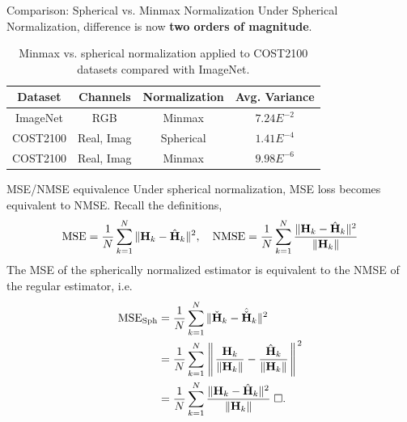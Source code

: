 \documentclass{beamer}
\begin{document}
  \begin{frame}{Comparison: Spherical vs. Minmax Normalization}
    Under Spherical Normalization, difference is now \textbf{two orders of magnitude}.
    \begin{table}[htb]
      \begin{center}
        \begin{tabular}{|c|c|c|c|}
        \hline
        \textbf{Dataset} & \textbf{Channels} & \textbf{Normalization} & \textbf{Avg. Variance} \\ \hline
        ImageNet       & RGB                 & Minmax                 & \underline{$7.24E^{-2}$}       \\ \hline
        COST2100       & Real, Imag          & Spherical              & \underline{$1.41E^{-4}$}       \\ \hline
        COST2100       & Real, Imag          & Minmax                 & $9.98E^{-6}$       \\ \hline
        \end{tabular}
        \caption{Minmax vs. spherical normalization applied to COST2100 datasets compared with ImageNet.}
        \label{tab:minmax-sph-compare} 
      \end{center}
    \end{table}
  \end{frame}
{}
  \begin{frame}{MSE/NMSE equivalence}
    \footnotesize{
    Under spherical normalization, MSE loss becomes equivalent to NMSE. Recall the definitions,
    \begin{align*}
      \text{MSE}=\frac 1N \sum_{k=1}^N\Arrowvert\mathbf H_k - \hat{\mathbf H}_k\Arrowvert^2,\quad \text{NMSE} =\frac 1N \sum_{k=1}^N\frac{\Arrowvert\mathbf H_k - \hat{\mathbf H}_k\Arrowvert^2}{\Arrowvert\mathbf H_k\Arrowvert} \\        
    \end{align*}
    \pause
    The MSE of the spherically normalized estimator is equivalent to the NMSE of the regular estimator, i.e.
    \begin{align*}
      \text{MSE}_{\text{Sph}} &= \frac 1N \sum_{k=1}^N\Arrowvert\check{\mathbf H}_k - \hat{\check{\mathbf H}}_k\Arrowvert^2 \\
      &= \frac 1N \sum_{k=1}^N\left\Arrowvert \frac{\mathbf H_k}{\Arrowvert\mathbf H_k\Arrowvert} - \frac{\hat{\mathbf H}_k}{\Arrowvert\mathbf H_k\Arrowvert}\right\Arrowvert^2 \\
      &= \frac 1N \sum_{k=1}^N\frac{\Arrowvert\mathbf H_k - \hat{\mathbf H}_k\Arrowvert^2}{\Arrowvert\mathbf H_k\Arrowvert} \; \Box.
    \end{align*}
    }
\end{frame}
\end{document}
